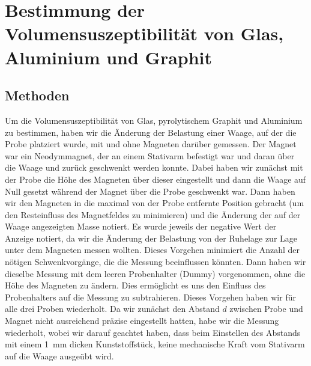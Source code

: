 \documentclass[
	a4paper,
	12pt,
	pagesize,
	ngerman
]{scrartcl}
\begin{document}
	\section{Bestimmung der Volumensuszeptibilität von Glas, Aluminium und Graphit}
	\subsection{Methoden}
	Um die Volumensuszeptibilität von Glas, pyrolytischem Graphit und Aluminium zu bestimmen, haben wir die Änderung der Belastung einer Waage, auf der die Probe platziert wurde, mit und ohne Magneten darüber gemessen. Der Magnet war ein Neodymmagnet, der an einem Stativarm befestigt war und daran über die Waage und zurück geschwenkt werden konnte. Dabei haben wir zunächst mit der Probe die Höhe des Magneten über dieser eingestellt und dann die Waage auf Null gesetzt während der Magnet über die Probe geschwenkt war. Dann haben wir den Magneten in die maximal von der Probe entfernte Position gebracht (um den Resteinfluss des Magnetfeldes zu minimieren) und die Änderung der auf der Waage angezeigten Masse notiert. Es wurde jeweils der negative Wert der Anzeige notiert, da wir die Änderung der Belastung von der Ruhelage zur Lage unter dem Magneten messen wollten. Dieses Vorgehen minimiert die Anzahl der nötigen Schwenkvorgänge, die die Messung beeinflussen könnten. Dann haben wir dieselbe Messung mit dem leeren Probenhalter (Dummy) vorgenommen, ohne die Höhe des Magneten zu ändern. Dies ermöglicht es uns den Einfluss des Probenhalters auf die Messung zu subtrahieren. Dieses Vorgehen haben wir für alle drei Proben wiederholt. Da wir zunächst den Abstand $d$ zwischen Probe und Magnet nicht ausreichend präzise eingestellt hatten, habe wir die Messung wiederholt, wobei wir darauf geachtet haben, dass beim Einstellen des Abstands mit einem \SI{1}{\milli \meter} dicken Kunststoffstück, keine mechanische Kraft vom Stativarm auf die Waage ausgeübt wird. 
\end{document}
